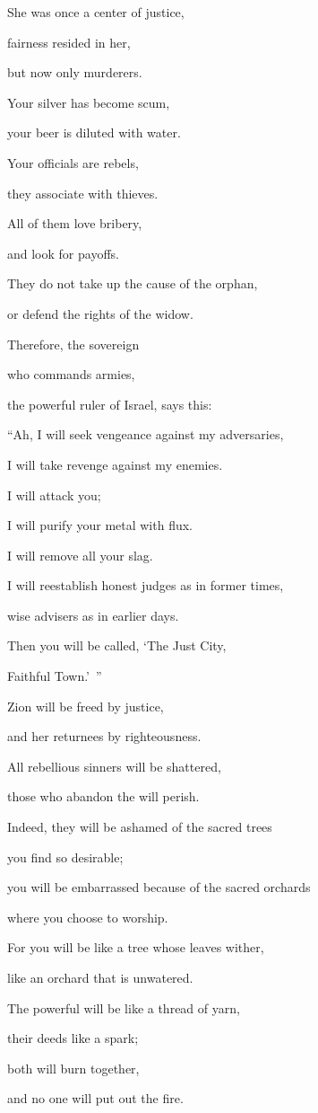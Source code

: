 {\par }{\Q She was once a center
of justice,
\par }{\Q fairness
resided
in her,
\par }{\Q but now
only murderers.
\par }{\Q {}Your silver
has become
scum,
\par }{\Q your beer
is diluted
with water.
\par }{\Q {}Your officials
are rebels,
\par }{\Q they associate
with thieves.
\par }{\Q All
of them love
bribery,
\par }{\Q and look for
payoffs.
\par }{\Q They do not
take up
the cause
of the orphan,
\par }{\Q or
defend
the rights of
the widow.
\par }{\Q {}Therefore,
the sovereign

{}
who commands armies,
\par }{\Q the powerful ruler
of Israel,
says
this:
\par }{\Q “Ah,
I will seek vengeance
against my adversaries,
\par }{\Q I will take revenge
against my enemies.
\par }{\Q {}I will attack
you;

\par }{\Q I will purify
your metal
with flux.
\par }{\Q I will remove
all
your slag.
\par }{\Q {}I will reestablish
honest judges
as in former
times,
\par }{\Q wise advisers
as in earlier
days.

\par }{\Q Then
you will be called,
‘The Just
City,
\par }{\Q Faithful
Town.’ ”
\par }{\Q Zion
will be freed by justice,
\par }{\Q and her returnees
by righteousness.
\par }{\Q {}All
rebellious
sinners
will be shattered,
\par }{\Q those who abandon
the {}
will perish.
\par }{\Q {}Indeed,
they will be ashamed
of the sacred trees
\par }{\Q you find so desirable;
\par }{\Q you will be embarrassed
because of the sacred orchards
\par }{\Q where
you choose to worship.
\par }{\Q {}For
you will be
like a tree
whose leaves
wither,
\par }{\Q like an orchard that is unwatered.
\par }{\Q {}The powerful
will be
like a thread
of yarn,
\par }{\Q their deeds
like a spark;
\par }{\Q both
will burn
together,
\par }{\Q and no
one will put out the fire.

}
